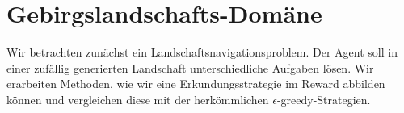 \chapter{Gebirgslandschafts-Domäne}\label{sec:NavigationProblem}
Wir betrachten zunächst ein Landschaftsnavigationsproblem. Der Agent soll in einer zufällig generierten Landschaft unterschiedliche Aufgaben lösen. Wir erarbeiten Methoden, wie wir eine Erkundungsstrategie im Reward abbilden können und vergleichen diese mit der herkömmlichen $ \epsilon $-greedy-Strategien.





